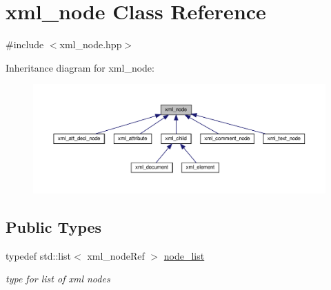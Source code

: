 \hypertarget{classxml__node}{}\section{xml\+\_\+node Class Reference}
\label{classxml__node}


{\ttfamily \#include $<$xml\+\_\+node.\+hpp$>$}



Inheritance diagram for xml\+\_\+node\+:
\nopagebreak
\begin{figure}[H]
\begin{center}
\leavevmode
\includegraphics[width=350pt]{dd/d5b/classxml__node__inherit__graph}
\end{center}
\end{figure}
\subsection*{Public Types}
\begin{DoxyCompactItemize}
\item 
typedef std\+::list$<$ xml\+\_\+node\+Ref $>$ \hyperlink{classxml__node_a4e558f6b9e873e9d0e92cfc8e7880385}{node\+\_\+list}
\begin{DoxyCompactList}\small\item\em type for list of xml nodes \end{DoxyCompactList}\end{DoxyCompactItemize}
